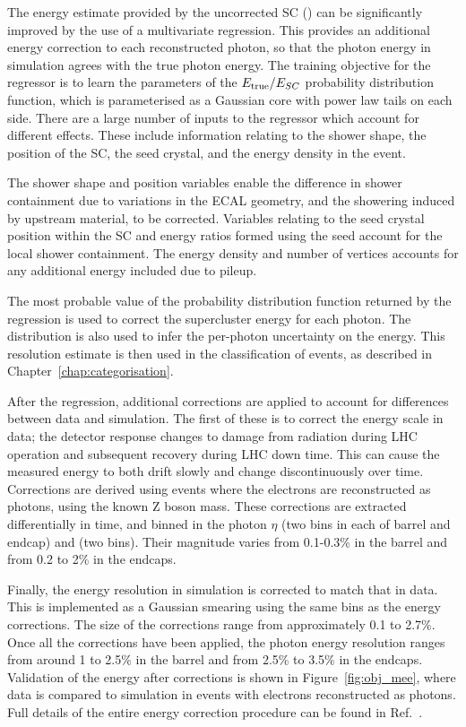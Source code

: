 The energy estimate provided by the uncorrected SC (\Eraw) can be significantly improved by the use of a multivariate regression.
This provides an additional energy correction to each reconstructed photon, so that the photon energy in simulation agrees with the true photon energy.
The training objective for the regressor is to learn the parameters of the $E_{\mathrm{true}}/E_{SC}$ probability distribution function, 
which is parameterised as a Gaussian core with power law tails on each side. %
There are a large number of inputs to the regressor which account for different effects.
These include information relating to the shower shape, the position of the SC, the seed crystal, and the energy density in the event.

The shower shape and position variables enable the difference in shower containment due to variations in the ECAL geometry, 
and the showering induced by upstream material, to be corrected.
Variables relating to the seed crystal position within the SC and energy ratios formed using the seed account for the local shower containment.
The energy density and number of vertices accounts for any additional energy included due to pileup.

The most probable value of the probability distribution function returned by the regression 
is used to correct the supercluster energy for each photon.
The distribution is also used to infer the per-photon uncertainty on the energy.
This resolution estimate is then used in the classification of events, as described in Chapter~\ref{chap:categorisation}.

After the regression, additional corrections are applied to account for differences between data and simulation.
The first of these is to correct the energy scale in data;
the detector response changes to damage from radiation during LHC operation and subsequent recovery during LHC down time.
This can cause the measured energy to both drift slowly and change discontinuously over time.
Corrections are derived using \Zee events where the electrons are reconstructed as photons, using the known Z boson mass.
These corrections are extracted differentially in time, and binned in the photon $\eta$ (two bins in each of barrel and endcap) and \RNINE (two bins).
Their magnitude varies from 0.1-0.3\% in the barrel and from 0.2 to 2\% in the endcaps.

Finally, the energy resolution in simulation is corrected to match that in data.
This is implemented as a Gaussian smearing using the same bins as the energy corrections.
The size of the corrections range from approximately 0.1 to 2.7\%.
Once all the corrections have been applied, the photon energy resolution ranges from around 1 to 2.5\% in the barrel
and from 2.5\% to 3.5\% in the endcaps.
Validation of the energy after corrections is shown in Figure~\ref{fig:obj_mee}, 
where data is compared to simulation in \Zee events with electrons reconstructed as photons.
Full details of the entire energy correction procedure can be found in Ref.~\cite{PhotonReco}.

